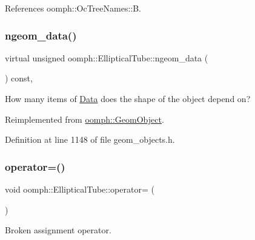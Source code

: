 References oomph\+::\+Oc\+Tree\+Names\+::B.

\mbox{\label{classoomph_1_1EllipticalTube_ad137810aac62250463273656db192ed7}} 
\subsubsection{\texorpdfstring{ngeom\+\_\+data()}{ngeom\_data()}}
{\footnotesize\ttfamily virtual unsigned oomph\+::\+Elliptical\+Tube\+::ngeom\+\_\+data (\begin{DoxyParamCaption}{ }\end{DoxyParamCaption}) const\hspace{0.3cm}{\ttfamily [inline]}, {\ttfamily [virtual]}}



How many items of \hyperlink{classoomph_1_1Data}{Data} does the shape of the object depend on? 



Reimplemented from \hyperlink{classoomph_1_1GeomObject_a19d325347e19964e127fe124df56f251}{oomph\+::\+Geom\+Object}.



Definition at line 1148 of file geom\+\_\+objects.\+h.

\mbox{\label{classoomph_1_1EllipticalTube_a2f85c6d060b35fc390f1ed940bf2f53d}} 
\subsubsection{\texorpdfstring{operator=()}{operator=()}}
{\footnotesize\ttfamily void oomph\+::\+Elliptical\+Tube\+::operator= (\begin{DoxyParamCaption}\item[{const \hyperlink{classoomph_1_1EllipticalTube}{Elliptical\+Tube} \&}]{ }\end{DoxyParamCaption})\hspace{0.3cm}{\ttfamily [inline]}}



Broken assignment operator. 



